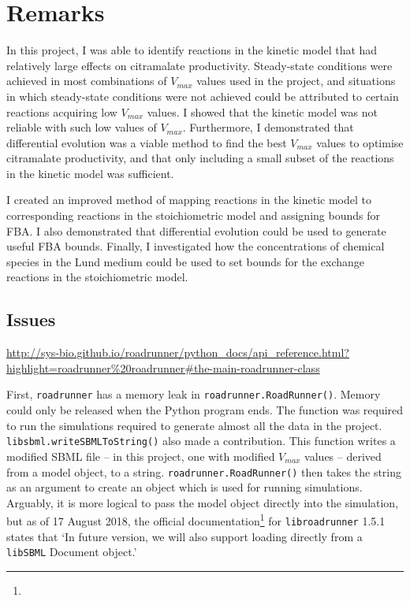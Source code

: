 \documentclass[parskip=full, numbers=noenddot]{scrreprt}
\begin{document}

\chapter{Remarks}
\label{ch:remarks}

In this project, I was able to identify reactions in the kinetic model that had relatively large effects on citramalate productivity. Steady-state conditions were achieved in most combinations of $V_{max}$ values used in the project, and situations in which steady-state conditions were not achieved could be attributed to certain reactions acquiring low $V_{max}$ values. I showed that the kinetic model was not reliable with such low values of $V_{max}$. Furthermore, I demonstrated that differential evolution was a viable method to find the best $V_{max}$ values to optimise citramalate productivity, and that only including a small subset of the reactions in the kinetic model was sufficient.

I created an improved method of mapping reactions in the kinetic model to corresponding reactions in the stoichiometric model and assigning bounds for FBA. I also demonstrated that differential evolution could be used to generate useful FBA bounds. Finally, I investigated how the concentrations of chemical species in the Lund medium could be used to set bounds for the exchange reactions in the stoichiometric model.

\section{Issues}
\label{sec:issues}

\urldef\myurl\url{http://sys-bio.github.io/roadrunner/python_docs/api_reference.html?highlight=roadrunner%20roadrunner#the-main-roadrunner-class}

First, \texttt{roadrunner} has a memory leak in \texttt{road\-runner.\-Road\-Runner\-()}. Memory could only be released when the Python program ends. The function was required to run the simulations required to generate almost all the data in the project. \texttt{libsbml\-.write\-SBML\-To\-String\-()} also made a contribution. This function writes a modified SBML file -- in this project, one with modified $V_{max}$ values -- derived from a model object, to a string. \texttt{road\-runner.\-Road\-Runner\-()} then takes the string as an argument to create an object which is used for running simulations. Arguably, it is more logical to pass the model object directly into the simulation, but as of 17 August 2018, the official documentation\footnote{\myurl} for \texttt{libroadrunner} 1.5.1 states that `In future version, we will also support loading directly from a \texttt{libSBML} Document object.'
\end{document}
